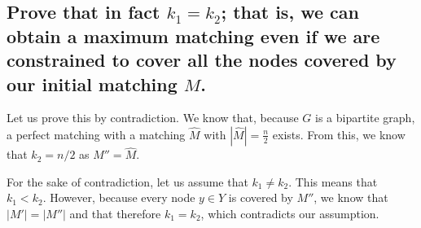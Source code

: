 \documentclass{article}
\begin{document}
\subsection{\textbf{Prove that in fact $k_1 = k_2$; that is, we can obtain a maximum matching even if we are constrained to cover all the nodes covered by our initial matching $M$.}}

Let us prove this by contradiction. We know that, because $G$ is a bipartite graph, a perfect matching with a matching $\hat{M}$ with $|\hat{M}| = \frac{n}{2}$ exists. From this, we know that $k_2 = n/2$ as $M'' = \hat{M}$.

For the sake of contradiction, let us assume that $k_1 \neq k_2$. This means that $k_1 < k_2$.
However, because every node $y\in Y$ is covered by $M''$, we know that $|M'| = |M''|$ and that therefore $k_1 = k_2$, which contradicts our assumption. 
\end{document}

